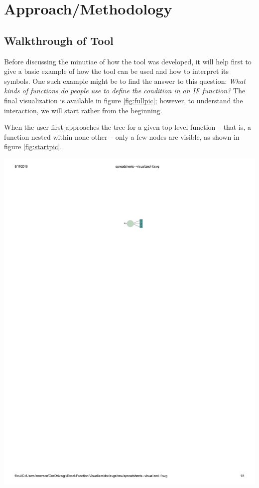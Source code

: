 \documentclass[conference]{IEEEtran}
\begin{document}
	\section{Approach/Methodology} \subsection{Walkthrough of Tool} Before
	discussing the minutiae of how the tool was developed, it will help first to
	give a basic example of how the tool can be used and how to interpret its
	symbols. One such example might be to find the answer to this question:
	\textit{ What kinds of functions do people use to define the condition in an IF
		function?} The final visualization is available in figure \ref{fig:fullpic};
	however, to understand the interaction, we will start rather from the
	beginning. \par When the user first approaches the tree for a given top-level
	function -- that is, a function nested within none other -- only a few nodes
	are visible, as shown in figure \ref{fig:startpic}. \par
	
	\centerline{\includegraphics{start}}
	
\end{document}
